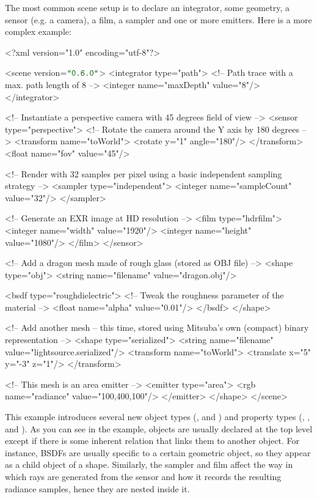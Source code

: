 The most common scene setup is to declare an integrator, some geometry, a sensor (e.g. a camera), a film, a sampler
and one or more emitters. Here is a more complex example:
\begin{xml}
<?xml version="1.0" encoding="utf-8"?>

<scene version=$\MtsVer$>
    <integrator type="path">
        <!-- Path trace with a max. path length of 8 -->
        <integer name="maxDepth" value="8"/>
    </integrator>

    <!-- Instantiate a perspective camera with 45 degrees field of view -->
    <sensor type="perspective">
        <!-- Rotate the camera around the Y axis by 180 degrees -->
        <transform name="toWorld">
            <rotate y="1" angle="180"/>
        </transform>
        <float name="fov" value="45"/>

        <!-- Render with 32 samples per pixel using a basic
             independent sampling strategy -->
        <sampler type="independent">
            <integer name="sampleCount" value="32"/>
        </sampler>

        <!-- Generate an EXR image at HD resolution -->
        <film type="hdrfilm">
            <integer name="width" value="1920"/>
            <integer name="height" value="1080"/>
        </film>
    </sensor>

    <!-- Add a dragon mesh made of rough glass (stored as OBJ file) -->
    <shape type="obj">
        <string name="filename" value="dragon.obj"/>

        <bsdf type="roughdielectric">
            <!-- Tweak the roughness parameter of the material -->
            <float name="alpha" value="0.01"/>
        </bsdf>
    </shape>

    <!-- Add another mesh -- this time, stored using Mitsuba's own
         (compact) binary representation -->
    <shape type="serialized">
        <string name="filename" value="lightsource.serialized"/>
        <transform name="toWorld">
            <translate x="5" y="-3" z="1"/>
        </transform>

        <!-- This mesh is an area emitter -->
        <emitter type="area">
            <rgb name="radiance" value="100,400,100"/>
        </emitter>
    </shape>
</scene>
\end{xml}
This example introduces several new object types (, and )
and property types (, , and ).
As you can see in the example, objects are usually declared at the top level except if there is some
inherent relation that links them to another object. For instance, BSDFs are usually specific to a certain geometric object, so
they appear as a child object of a shape. Similarly, the sampler and film affect the way in which
rays are generated from the sensor and how it records the resulting radiance samples, hence they are nested inside it.

